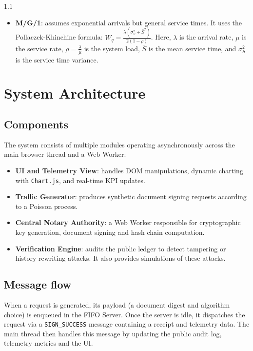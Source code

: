\documentclass[11pt,a4paper]{article}
\begin{document}
\begin{spacing}{1.1}
\begin{itemize}
  \item \textbf{M/G/1}: assumes exponential arrivals but general service times. It uses the Pollaczek-Khinchine formula: $W_q = \frac{\lambda(\sigma_S^2 + \bar{S}^2)}{2 (1-\rho)}$.
  Here, $\lambda$ is the arrival rate, $\mu$ is the service rate, $\rho = \frac{\lambda}{\mu}$ is the system load, $\bar{S}$ is the mean service time, and $\sigma_S^2$ is the service time variance.
\end{itemize}

\pagebreak

\section{System Architecture}

\subsection{Components}

The system consists of multiple modules operating asynchronously across the main browser thread and a Web Worker:

\begin{itemize}
\item \textbf{UI and Telemetry View}: handles DOM manipulations, dynamic charting with \texttt{Chart.js}, and real-time KPI updates.
\item \textbf{Traffic Generator}: produces synthetic document signing requests according to a Poisson process.
\item \textbf{Central Notary Authority}: a Web Worker responsible for cryptographic key generation, document signing and hash chain computation.
\item \textbf{Verification Engine}: audits the public ledger to detect tampering or history-rewriting attacks. It also provides simulations of these attacks.
\end{itemize}


\subsection{Message flow}

When a request is generated, its payload (a document digest and algorithm choice) is enqueued in the FIFO Server. Once the server is idle, it dispatches the request via a \texttt{SIGN\_SUCCESS} message containing a receipt and telemetry data. The main thread then handles this message by updating the public audit log, telemetry metrics and the UI.


\end{spacing}
\end{document}
